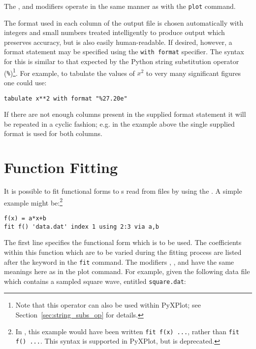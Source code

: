\noindent The ,  and  modifiers
operate in the same manner as with the {\tt plot} command.

The format used in each column of the output file is chosen automatically with
integers and small numbers treated intelligently to produce output which
preserves accuracy, but is also easily human-readable. If desired, however, a
format statement may be specified using the {\tt with format} specifier. The
syntax for this is similar to that expected by the Python string substitution
operator ({\tt \%})\footnote{Note that this operator can also be used
within PyXPlot; see Section~\ref{sec:string_subs_op} for details.}.  For example,
to tabulate the values of $x^2$ to very many significant figures one could use:

\begin{verbatim}
tabulate x**2 with format "%27.20e"
\end{verbatim}

If there are not enough columns present in the supplied format statement it
will be repeated in a cyclic fashion; e.g. in the example above the single
supplied format is used for both columns.

\section{Function Fitting}
\label{sec:fit_command}

It is possible to fit functional forms to \datapoint s read from files by using
the . A simple example might be:\footnote{In \gnuplot, this
example would have been written {\tt fit f(x) ...}, rather than {\tt fit f()
...}. This syntax is supported in PyXPlot, but is deprecated.}

\begin{verbatim}
f(x) = a*x+b
fit f() 'data.dat' index 1 using 2:3 via a,b
\end{verbatim}

The first line specifies the functional form which is to be used.  The
coefficients within this function which are to be varied during the fitting
process are listed after the keyword  in the {\tt fit} command.
The modifiers , ,  and
 have the same meanings here as in the plot command.  For
example, given the following data file which contains a sampled square wave,
entitled {\tt square.dat}:

